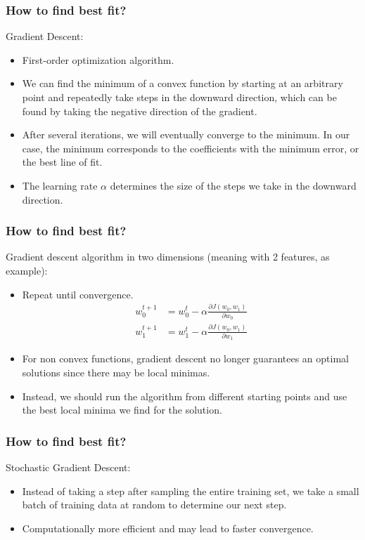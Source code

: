 \begin{frame}[fragile]\frametitle{How to find best fit?}
Gradient Descent:
\begin{itemize}
\item First-order optimization algorithm.
\item We can find the minimum of a convex function by
starting at an arbitrary point and repeatedly take steps
in the downward direction, which can be found by taking
the negative direction of the gradient. 
\item After several
iterations, we will eventually converge to the minimum.
In our case, the minimum corresponds to the coefficients
with the minimum error, or the best line of fit. 
\item The
learning rate $\alpha$ determines the size of the steps we take
in the downward direction.
\end{itemize}
\end{frame}

\begin{frame}[fragile]\frametitle{How to find best fit?}
Gradient descent algorithm in two dimensions (meaning with 2 features, as example):
\begin{itemize}
\item  Repeat until convergence.
\begin{align*}
w_0^{t+1} &= w_0^t - \alpha \frac{\partial J(w_0,w_1)}{\partial w_{0}}\\
w_1^{t+1} &= w_1^t - \alpha \frac{\partial J(w_0,w_1)}{\partial w_{1}}
\end{align*}
\item For non convex functions, gradient descent no longer guarantees an optimal solutions since there may be local minimas. 
\item Instead, we should run the algorithm from different
starting points and use the best local minima we find for
the solution.
\end{itemize}

\end{frame}

\begin{frame}[fragile]\frametitle{How to find best fit?}
Stochastic Gradient Descent:

\begin{itemize}
\item  Instead of taking a step
after sampling the entire training set, we take a small
batch of training data at random to determine our next
step. 
\item Computationally more efficient and may lead to
faster convergence.
\end{itemize}

\end{frame}

